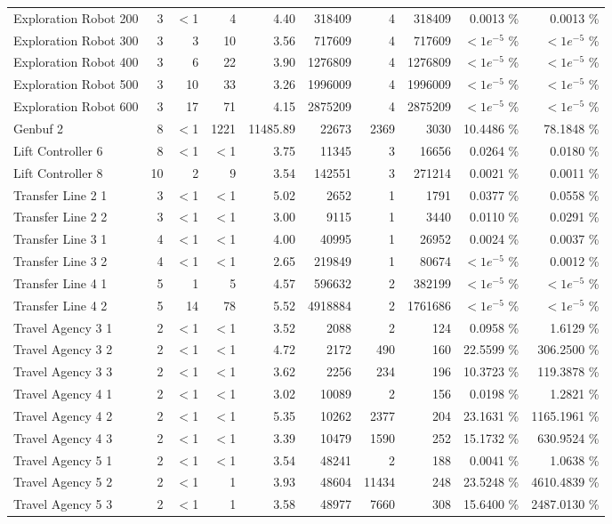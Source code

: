 \begin{tabular}{|l|r|rrr|rrr|rr|}
  Exploration Robot 200 &   3 & $<$1 & 4 & 4.40 & 318409 &   4 & 318409 &  0.0013 \% &    0.0013 \% \\ 
  Exploration Robot 300 &   3 & 3 & 10 & 3.56 & 717609 &   4 & 717609 & $<1e^{-5}$ \% & $<1e^{-5}$ \% \\ 
  Exploration Robot 400 &   3 & 6 & 22 & 3.90 & 1276809 &   4 & 1276809 & $<1e^{-5}$ \% & $<1e^{-5}$ \% \\ 
  Exploration Robot 500 &   3 & 10 & 33 & 3.26 & 1996009 &   4 & 1996009 & $<1e^{-5}$ \% & $<1e^{-5}$ \% \\ 
  Exploration Robot 600 &   3 & 17 & 71 & 4.15 & 2875209 &   4 & 2875209 & $<1e^{-5}$ \% & $<1e^{-5}$ \% \\ 
  Genbuf 2 &   8 & $<$1 & 1221 & 11485.89 & 22673 & 2369 & 3030 & 10.4486 \% &   78.1848 \% \\ 
  Lift Controller 6 &   8 & $<$1 & $<$1 & 3.75 & 11345 &   3 & 16656 &  0.0264 \% &    0.0180 \% \\ 
  Lift Controller 8 &  10 & 2 & 9 & 3.54 & 142551 &   3 & 271214 &  0.0021 \% &    0.0011 \% \\ 
  Transfer Line 2 1 &   3 & $<$1 & $<$1 & 5.02 & 2652 &   1 & 1791 &  0.0377 \% &    0.0558 \% \\ 
  Transfer Line 2 2 &   3 & $<$1 & $<$1 & 3.00 & 9115 &   1 & 3440 &  0.0110 \% &    0.0291 \% \\ 
  Transfer Line 3 1 &   4 & $<$1 & $<$1 & 4.00 & 40995 &   1 & 26952 &  0.0024 \% &    0.0037 \% \\ 
  Transfer Line 3 2 &   4 & $<$1 & $<$1 & 2.65 & 219849 &   1 & 80674 & $<1e^{-5}$ \% &    0.0012 \% \\ 
  Transfer Line 4 1 &   5 & 1 & 5 & 4.57 & 596632 &   2 & 382199 & $<1e^{-5}$ \% & $<1e^{-5}$ \% \\ 
  Transfer Line 4 2 &   5 & 14 & 78 & 5.52 & 4918884 &   2 & 1761686 & $<1e^{-5}$ \% & $<1e^{-5}$ \% \\ 
  Travel Agency 3 1 &   2 & $<$1 & $<$1 & 3.52 & 2088 &   2 & 124 &  0.0958 \% &    1.6129 \% \\ 
  Travel Agency 3 2 &   2 & $<$1 & $<$1 & 4.72 & 2172 & 490 & 160 & 22.5599 \% &  306.2500 \% \\ 
  Travel Agency 3 3 &   2 & $<$1 & $<$1 & 3.62 & 2256 & 234 & 196 & 10.3723 \% &  119.3878 \% \\ 
  Travel Agency 4 1 &   2 & $<$1 & $<$1 & 3.02 & 10089 &   2 & 156 &  0.0198 \% &    1.2821 \% \\ 
  Travel Agency 4 2 &   2 & $<$1 & $<$1 & 5.35 & 10262 & 2377 & 204 & 23.1631 \% & 1165.1961 \% \\ 
  Travel Agency 4 3 &   2 & $<$1 & $<$1 & 3.39 & 10479 & 1590 & 252 & 15.1732 \% &  630.9524 \% \\ 
  Travel Agency 5 1 &   2 & $<$1 & $<$1 & 3.54 & 48241 &   2 & 188 &  0.0041 \% &    1.0638 \% \\ 
  Travel Agency 5 2 &   2 & $<$1 & 1 & 3.93 & 48604 & 11434 & 248 & 23.5248 \% & 4610.4839 \% \\ 
  Travel Agency 5 3 &   2 & $<$1 & 1 & 3.58 & 48977 & 7660 & 308 & 15.6400 \% & 2487.0130 \% \\ 
   \hline
\end{tabular}
